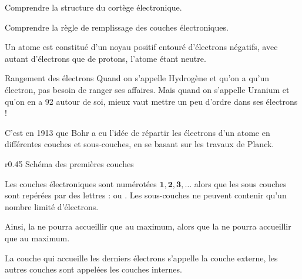 \teteSndAtom

\vspace*{-36pt}


\vspace*{-8pt}
\begin{objectifs}
  \item Comprendre la structure du cortège électronique.
  \item Comprendre la règle de remplissage des couches électroniques.
\end{objectifs}

\begin{contexte}
  Un atome est constitué d'un noyau positif entouré d'électrons négatifs, avec autant d'électrons que de protons, l'atome étant neutre.
  
\end{contexte}


\begin{doc}{Rangement des électrons}
  Quand on s'appelle Hydrogène et qu'on a qu'un électron, pas besoin de ranger ses affaires.
  Mais quand on s'appelle Uranium et qu'on en a 92 autour de soi, mieux vaut mettre un peu d'ordre dans ses électrons !
  
  C'est en 1913 que Bohr a eu l'idée de répartir les électrons d'un atome en différentes couches et sous-couches, en se basant sur les travaux de Planck.
  
  \begin{wrapfigure}{r}{0.45\linewidth}
    \centering
    \vspace*{-16pt}
    {\small Schéma des premières couches}
  \end{wrapfigure}
  
  Les couches électroniques sont numérotées $\mathbf{1, 2, 3,\ldots}$ alors que les sous couches sont repérées par des lettres :  ou .
  Les sous-couches ne peuvent contenir qu'un nombre limité d'électrons.
  
  Ainsi, la  ne pourra accueillir que  au maximum, alors que la  ne pourra accueillir que  au maximum.
  
  La couche qui accueille les derniers électrons s'appelle la couche externe, les autres couches sont appelées les couches internes.
\end{doc}

